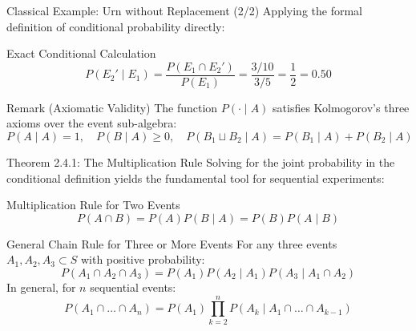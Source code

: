 \documentclass[10pt,aspectratio=169]{beamer}
\begin{document}
\begin{frame}{Classical Example: Urn without Replacement (2/2)}
  \small
  Applying the formal definition of conditional probability directly: \pause

  \vspace{0.2em}
  \begin{alertblock}{Exact Conditional Calculation}
    $$P(E_2' \mid E_1) = \dfrac{P(E_1 \cap E_2')}{P(E_1)} = \dfrac{3/10}{3/5} = \dfrac{1}{2} = 0.50$$
  \end{alertblock}

  \vspace{0.2em}
  \pause
  \begin{block}{Remark (Axiomatic Validity)}
    The function $P(\cdot \mid A)$ satisfies Kolmogorov's three axioms over the event sub-algebra:
    $$P(A \mid A) = 1, \quad P(B \mid A) \geq 0, \quad P(B_1 \sqcup B_2 \mid A) = P(B_1 \mid A) + P(B_2 \mid A)$$
  \end{block}
\end{frame}

\begin{frame}{Theorem 2.4.1: The Multiplication Rule}
  \footnotesize
  Solving for the joint probability in the conditional definition yields the fundamental tool for sequential experiments: \pause

  \vspace{0.1em}
  \begin{block}{Multiplication Rule for Two Events}
    $$P(A \cap B) = P(A) P(B \mid A) = P(B) P(A \mid B)$$
  \end{block}

  \vspace{0.1em}
  \pause
  \begin{block}{General Chain Rule for Three or More Events}
    For any three events $A_1, A_2, A_3 \subset S$ with positive probability:
    $$P(A_1 \cap A_2 \cap A_3) = P(A_1) P(A_2 \mid A_1) P(A_3 \mid A_1 \cap A_2)$$
    In general, for $n$ sequential events:
    $$P(A_1 \cap \dots \cap A_n) = P(A_1) \prod_{k=2}^{n} P(A_k \mid A_1 \cap \dots \cap A_{k-1})$$
  \end{block}
\end{frame}
\end{document}

